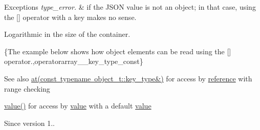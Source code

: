 \begin{DoxyExceptions}{Exceptions}
{\em type\+\_\+error.} & if the J\+S\+ON value is not an object; in that case, using the \mbox{[}\mbox{]} operator with a key makes no sense.\\
\hline
\end{DoxyExceptions}
Logarithmic in the size of the container.

\{The example below shows how object elements can be read using the {\ttfamily \mbox{[}\mbox{]}} operator.,operatorarray\+\_\+\+\_\+key\+\_\+type\+\_\+const\}

\begin{DoxySeeAlso}{See also}
\mbox{\hyperlink{classnlohmann_1_1basic__json_a93403e803947b86f4da2d1fb3345cf2c}{at(const typename object\+\_\+t\+::key\+\_\+type\&)}} for access by \mbox{\hyperlink{classnlohmann_1_1basic__json_ac6a5eddd156c776ac75ff54cfe54a5bc}{reference}} with range checking 

\mbox{\hyperlink{classnlohmann_1_1basic__json_adcf8ca5079f5db993820bf50036bf45d}{value()}} for access by \mbox{\hyperlink{classnlohmann_1_1basic__json_adcf8ca5079f5db993820bf50036bf45d}{value}} with a default \mbox{\hyperlink{classnlohmann_1_1basic__json_adcf8ca5079f5db993820bf50036bf45d}{value}}
\end{DoxySeeAlso}
\begin{DoxySince}{Since}
version 1.. 
\end{DoxySince}
\mbox{\label{classnlohmann_1_1basic__json_ac6946dffeb3be5aa173645f0467a44b3}} 
